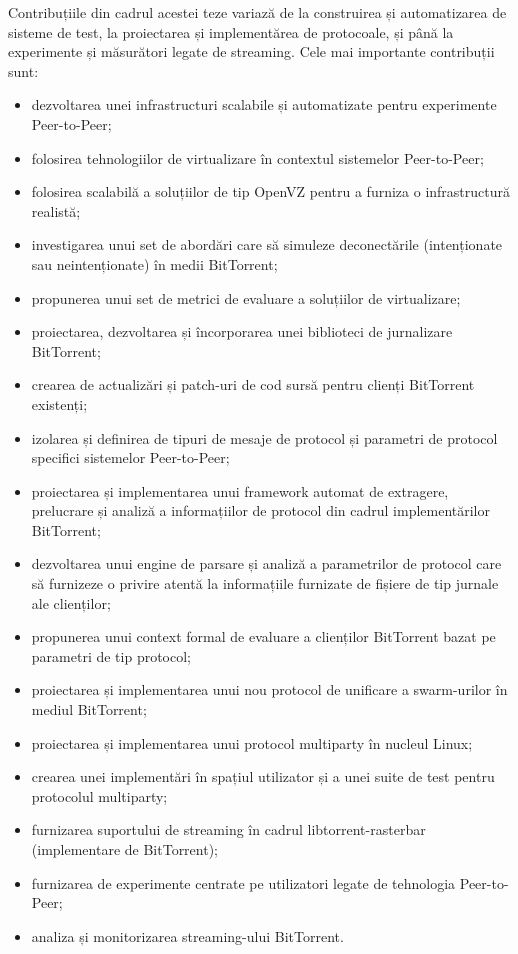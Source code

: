 Contribuțiile din cadrul acestei teze variază de la construirea și
automatizarea de sisteme de test, la proiectarea și implementărea de
protocoale, și până la experimente și măsurători legate de streaming. Cele mai
importante contribuții sunt:

\begin{itemize}
  \item dezvoltarea unei infrastructuri scalabile și automatizate pentru
  experimente Peer-to-Peer;
  \item folosirea tehnologiilor de virtualizare în contextul sistemelor
  Peer-to-Peer;
  \item folosirea scalabilă a soluțiilor de tip OpenVZ pentru a furniza o
  infrastructură realistă;
  \item investigarea unui set de abordări care să simuleze deconectările
  (intenționate sau neintenționate) în medii BitTorrent;
  \item propunerea unui set de metrici de evaluare a soluțiilor de
  virtualizare;
  \item proiectarea, dezvoltarea și încorporarea unei biblioteci de
  jurnalizare BitTorrent;
  \item crearea de actualizări și patch-uri de cod sursă pentru clienți
  BitTorrent existenți;
  \item izolarea și definirea de tipuri de mesaje de protocol și parametri de
  protocol specifici sistemelor Peer-to-Peer;
  \item proiectarea și implementarea unui framework automat de extragere,
  prelucrare și analiză a informațiilor de protocol din cadrul implementărilor
  BitTorrent;
  \item dezvoltarea unui engine de parsare și analiză a parametrilor de
  protocol care să furnizeze o privire atentă la informațiile furnizate de
  fișiere de tip jurnale ale clienților;
  \item propunerea unui context formal de evaluare a clienților BitTorrent
  bazat pe parametri de tip protocol;
  \item proiectarea și implementarea unui nou protocol de unificare a
  swarm-urilor în mediul BitTorrent;
  \item proiectarea și implementarea unui protocol multiparty în nucleul
  Linux;
  \item crearea unei implementări în spațiul utilizator și a unei suite de
  test pentru protocolul multiparty;
  \item furnizarea suportului de streaming în cadrul libtorrent-rasterbar
  (implementare de BitTorrent);
  \item furnizarea de experimente centrate pe utilizatori legate de tehnologia
  Peer-to-Peer;
  \item analiza și monitorizarea streaming-ului BitTorrent.
\end{itemize}

